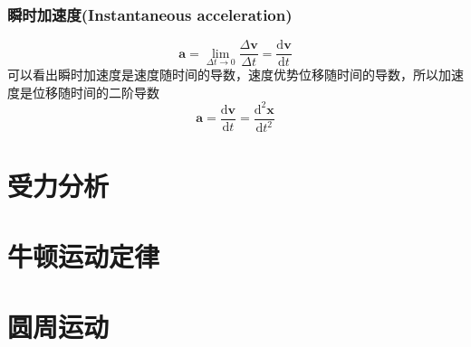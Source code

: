 \documentclass[a4paper,oneside,11pt]{article}
\newcommand{\bol}[1]{\textbf{#1}}
\newcommand{\diff}{\mathrm{d}}
\begin{document}
\subsubsection{瞬时加速度(Instantaneous acceleration)}
\begin{displaymath}
	\bol{a} = \lim_{\Delta t \to 0} \frac{\Delta \bol{v}}{\Delta t} = \frac{\diff \bol{v}}{\diff t}
\end{displaymath}
可以看出瞬时加速度是速度随时间的导数，速度优势位移随时间的导数，所以加速度是位移随时间的二阶导数
\begin{displaymath}
	\bol{a} = \frac{\diff \bol{v}}{\diff t} = \frac{\diff^2 \bol{x}}{\diff t^2}
\end{displaymath}
\section{受力分析}
\section{牛顿运动定律}
\section{圆周运动}
\end{document}
